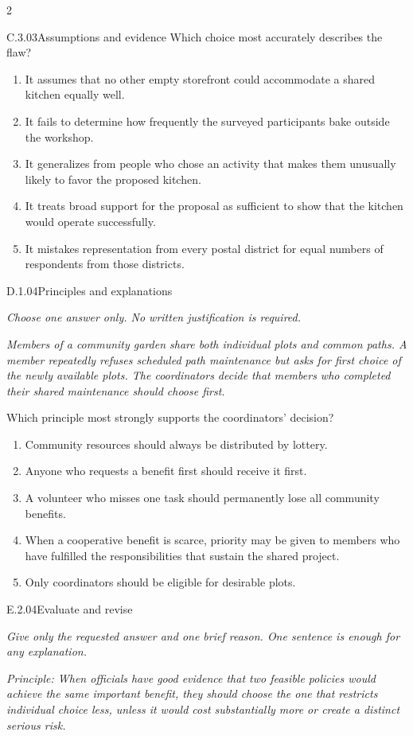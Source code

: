 \documentclass[9pt]{extarticle}
\newcommand{\choice}[1]{\item #1}
\begin{document}
\begin{multicols}{2}
\begin{DenseCoreProblem}{C.3.03}{Assumptions and evidence}
Which choice most accurately describes the flaw?
\begin{enumerate}[label=(\alph*)]
  \choice{It assumes that no other empty storefront could accommodate a shared kitchen equally well.}
  \choice{It fails to determine how frequently the surveyed participants bake outside the workshop.}
  \choice{It generalizes from people who chose an activity that makes them unusually likely to favor the proposed kitchen.}
  \choice{It treats broad support for the proposal as sufficient to show that the kitchen would operate successfully.}
  \choice{It mistakes representation from every postal district for equal numbers of respondents from those districts.}
\end{enumerate}
\end{DenseCoreProblem}
\begin{DenseCoreProblem}{D.1.04}{Principles and explanations}
{\scriptsize\textit{Choose one answer only. No written justification is required.}\par}
\emph{Members of a community garden share both individual plots and common paths. A member repeatedly refuses scheduled path maintenance but asks for first choice of the newly available plots. The coordinators decide that members who completed their shared maintenance should choose first.}

Which principle most strongly supports the coordinators' decision?
\begin{enumerate}[label=(\alph*)]
  \choice{Community resources should always be distributed by lottery.}
  \choice{Anyone who requests a benefit first should receive it first.}
  \choice{A volunteer who misses one task should permanently lose all community benefits.}
  \choice{When a cooperative benefit is scarce, priority may be given to members who have fulfilled the responsibilities that sustain the shared project.}
  \choice{Only coordinators should be eligible for desirable plots.}
\end{enumerate}
\end{DenseCoreProblem}
\begin{DenseCoreProblem}{E.2.04}{Evaluate and revise}
{\scriptsize\textit{Give only the requested answer and one brief reason. One sentence is enough for any explanation.}\par}
\emph{Principle: When officials have good evidence that two feasible policies would achieve the same important benefit, they should choose the one that restricts individual choice less, unless it would cost substantially more or create a distinct serious risk.}


\end{DenseCoreProblem}
\end{multicols}
\end{document}
